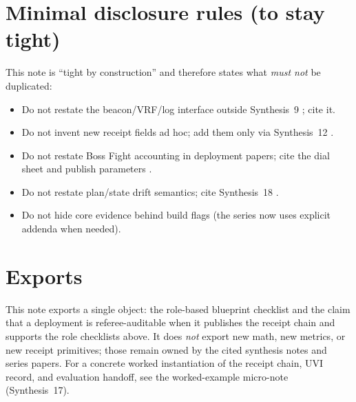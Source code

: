 \documentclass[11pt]{article}
\begin{document}
\section{Minimal disclosure rules (to stay tight)}

This note is ``tight by construction'' and therefore states what \emph{must not} be duplicated:
\begin{itemize}[leftmargin=*]
\item Do not restate the beacon/VRF/log interface outside Synthesis~9 \cite{series:transparency}; cite it.
\item Do not invent new receipt fields ad hoc; add them only via Synthesis~12 \cite{series:receiptitems}.
\item Do not restate Boss Fight accounting in deployment papers; cite the dial sheet and publish parameters \cite{series:bossfightdial}.
\item Do not restate plan/state drift semantics; cite Synthesis~18 \cite{series:planstateequiv}.
\item Do not hide core evidence behind build flags (the series now uses explicit addenda when needed).
\end{itemize}

\section*{Exports}
This note exports a single object: the role-based blueprint checklist and the claim that a deployment is referee-auditable when it publishes the receipt chain and supports the role checklists above.
It does \emph{not} export new math, new metrics, or new receipt primitives; those remain owned by the cited synthesis notes and series papers.
For a concrete worked instantiation of the receipt chain, UVI record, and evaluation handoff, see the worked-example micro-note (Synthesis~17).\cite{series:workedexample}
\end{document}
